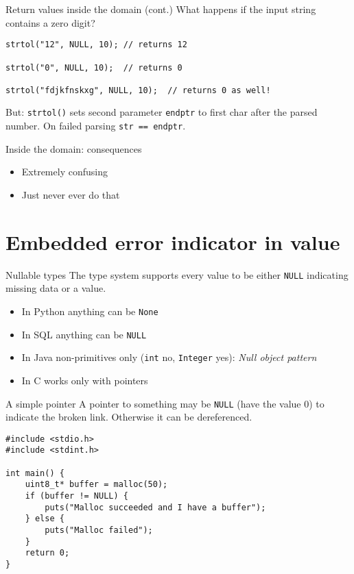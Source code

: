 \documentclass[aspectratio=169,14pt]{beamer}
\begin{document}
\begin{frame}[fragile]{Return values inside the domain (cont.)}
What happens if the input string contains a zero digit?

\begin{lstlisting}[style=cstyle]
strtol("12", NULL, 10); // returns 12

strtol("0", NULL, 10);  // returns 0

strtol("fdjkfnskxg", NULL, 10);  // returns 0 as well!
\end{lstlisting}

But: \texttt{strtol()} sets second parameter \texttt{endptr} to first char after the parsed number. On failed parsing \texttt{str == endptr}.
\end{frame}




\begin{frame}[fragile]{Inside the domain: consequences}
\begin{itemize}
    \item[\bad] Extremely confusing
    \item[\bad] Just never ever do that
\end{itemize}
\end{frame}




\section{Embedded error indicator in value}

\begin{frame}{Nullable types}
The type system supports every value to be either \texttt{NULL} indicating missing data or a value.

\begin{itemize}
    \item In Python anything can be \texttt{None}
    \item In SQL anything can be \texttt{NULL}
    \item In Java non-primitives only (\texttt{int} no, \texttt{Integer} yes): \textit{Null object pattern}
    \item In C works only with pointers
\end{itemize}
\end{frame}



\begin{frame}[fragile]{A simple pointer}
A pointer to something may be \texttt{NULL} (have the value 0) to indicate the broken link. Otherwise it can be dereferenced.

\begin{lstlisting}[style=cstyle]
#include <stdio.h>
#include <stdint.h>

int main() {
    uint8_t* buffer = malloc(50);
    if (buffer != NULL) {
        puts("Malloc succeeded and I have a buffer");
    } else {
        puts("Malloc failed");
    }
    return 0;
}
\end{lstlisting}
\end{frame}
\end{document}
